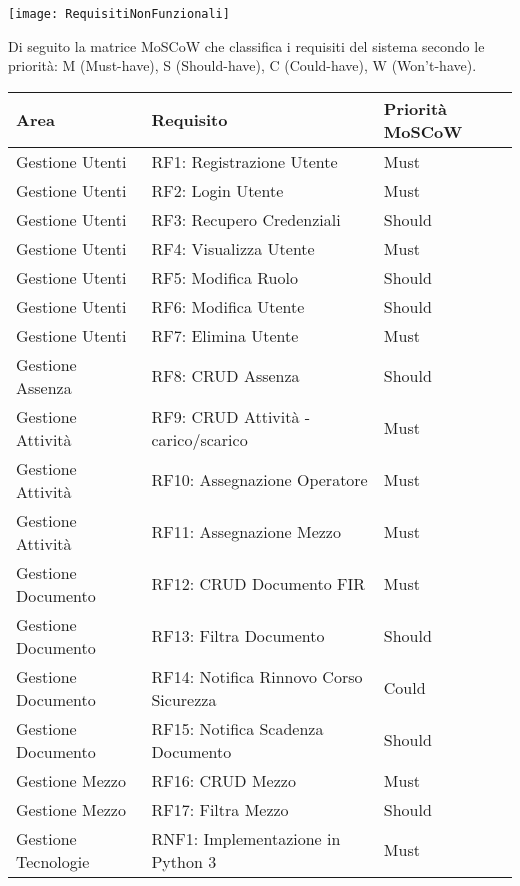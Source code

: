 \documentclass[a4paper]{report}
\begin{document}
\begin{figure*}[ht]
    \centering
    \texttt{[image: RequisitiNonFunzionali]}
\end{figure*}


\clearpage
{}

Di seguito la matrice MoSCoW che classifica i requisiti del sistema secondo le priorità: M (Must-have), S (Should-have), C (Could-have), W (Won't-have).

\begin{longtable}{|p{4.5cm}|p{6.25cm}|p{2cm}|}
\hline
	\textbf{Area} & \textbf{Requisito} & \textbf{Priorità MoSCoW} \\
\hline
\endhead

Gestione Utenti & RF1: Registrazione Utente & Must \\
\hline
Gestione Utenti & RF2: Login Utente & Must \\
\hline
Gestione Utenti & RF3: Recupero Credenziali & Should \\
\hline
Gestione Utenti & RF4: Visualizza Utente & Must \\
\hline
Gestione Utenti & RF5: Modifica Ruolo & Should \\
\hline
Gestione Utenti & RF6: Modifica Utente & Should \\
\hline
Gestione Utenti & RF7: Elimina Utente & Must \\
\hline
Gestione Assenza & RF8: CRUD Assenza & Should \\
\hline
Gestione Attività & RF9: CRUD Attività - carico/scarico & Must \\
\hline
Gestione Attività & RF10: Assegnazione Operatore & Must \\
\hline
Gestione Attività & RF11: Assegnazione Mezzo & Must \\
\hline
Gestione Documento & RF12: CRUD Documento FIR & Must \\
\hline
Gestione Documento & RF13: Filtra Documento & Should \\
\hline
Gestione Documento & RF14: Notifica Rinnovo Corso Sicurezza & Could \\
\hline
Gestione Documento & RF15: Notifica Scadenza Documento & Should \\
\hline
Gestione Mezzo & RF16: CRUD Mezzo & Must \\
\hline
Gestione Mezzo & RF17: Filtra Mezzo & Should \\
\hline
Gestione Tecnologie & RNF1: Implementazione in Python 3 & Must \\

\end{longtable}
\end{document}
